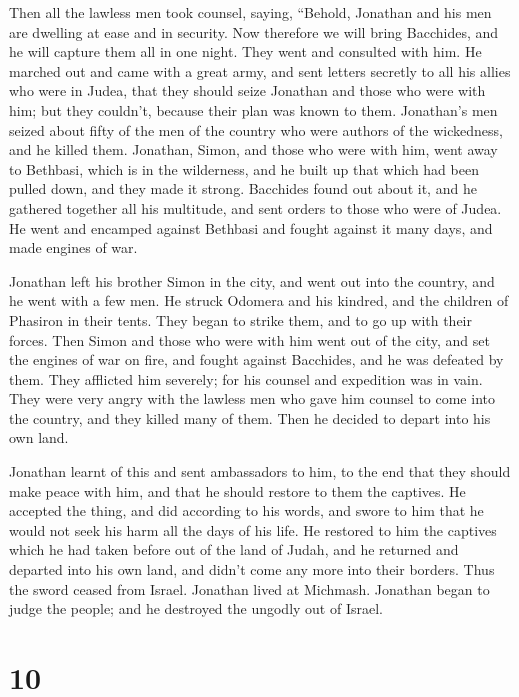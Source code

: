  Then all the lawless men took counsel, saying, ``Behold,
Jonathan and his men are dwelling at ease and in security. Now therefore
we will bring Bacchides, and he will capture them all in one night.
 They went and consulted with him.  He marched
out and came with a great army, and sent letters secretly to all his
allies who were in Judea, that they should seize Jonathan and those who
were with him; but they couldn't, because their plan was known to them.
 Jonathan's men seized about fifty of the men of the
country who were authors of the wickedness, and he killed them.
 Jonathan, Simon, and those who were with him, went away to
Bethbasi, which is in the wilderness, and he built up that which had
been pulled down, and they made it strong.  Bacchides found
out about it, and he gathered together all his multitude, and sent
orders to those who were of Judea.  He went and encamped
against Bethbasi and fought against it many days, and made engines of
war.

 Jonathan left his brother Simon in the city, and went out
into the country, and he went with a few men.  He struck
Odomera and his kindred, and the children of Phasiron in their tents.
 They began to strike them, and to go up with their forces.
Then Simon and those who were with him went out of the city, and set the
engines of war on fire,  and fought against Bacchides, and
he was defeated by them. They afflicted him severely; for his counsel
and expedition was in vain.  They were very angry with the
lawless men who gave him counsel to come into the country, and they
killed many of them. Then he decided to depart into his own land.

 Jonathan learnt of this and sent ambassadors to him, to
the end that they should make peace with him, and that he should restore
to them the captives.  He accepted the thing, and did
according to his words, and swore to him that he would not seek his harm
all the days of his life.  He restored to him the captives
which he had taken before out of the land of Judah, and he returned and
departed into his own land, and didn't come any more into their borders.
 Thus the sword ceased from Israel. Jonathan lived at
Michmash. Jonathan began to judge the people; and he destroyed the
ungodly out of Israel.

\hypertarget{section-9}{%
\section{10}\label{section-9}}


